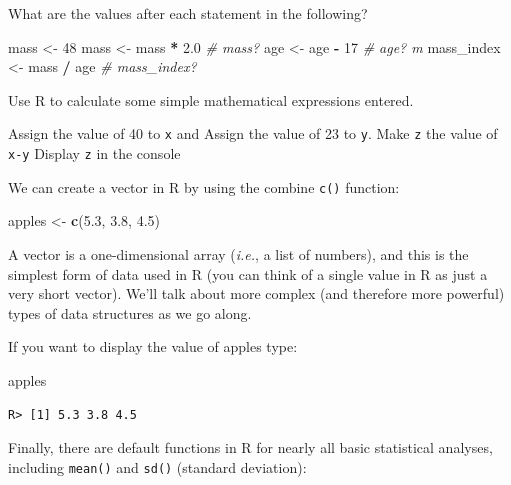 \documentclass[
]{book}
\newenvironment{Shaded}{\begin{snugshade}}{\end{snugshade}}
\newcommand{\CommentTok}[1]{\textcolor[rgb]{0.56,0.35,0.01}{\textit{#1}}}
\newcommand{\DecValTok}[1]{\textcolor[rgb]{0.00,0.00,0.81}{#1}}
\newcommand{\FloatTok}[1]{\textcolor[rgb]{0.00,0.00,0.81}{#1}}
\newcommand{\KeywordTok}[1]{\textcolor[rgb]{0.13,0.29,0.53}{\textbf{#1}}}
\newcommand{\NormalTok}[1]{#1}
\newcommand{\OperatorTok}[1]{\textcolor[rgb]{0.81,0.36,0.00}{\textbf{#1}}}
\newcommand{\StringTok}[1]{\textcolor[rgb]{0.31,0.60,0.02}{#1}}
\begin{document}
What are the values after each statement in the following?

\begin{Shaded}
\begin{Highlighting}[]
\NormalTok{mass <{-}}\StringTok{ }\DecValTok{48} 
\NormalTok{mass <{-}}\StringTok{ }\NormalTok{mass }\OperatorTok{*}\StringTok{ }\FloatTok{2.0} \CommentTok{\# mass? }
\NormalTok{age <{-}}\StringTok{ }\NormalTok{age }\OperatorTok{{-}}\StringTok{ }\DecValTok{17} \CommentTok{\# age? m}
\NormalTok{mass\_index <{-}}\StringTok{ }\NormalTok{mass }\OperatorTok{/}\StringTok{ }\NormalTok{age }\CommentTok{\# mass\_index?}
\end{Highlighting}
\end{Shaded}

Use R to calculate some simple mathematical expressions entered.

Assign the value of 40 to \texttt{x} and Assign the value of 23 to \texttt{y}. Make \texttt{z} the value of \texttt{x-y} Display \texttt{z} in the console

We can create a vector in R by using the combine \texttt{c()} function:

\begin{Shaded}
\begin{Highlighting}[]
\NormalTok{apples <{-}}\StringTok{ }\KeywordTok{c}\NormalTok{(}\FloatTok{5.3}\NormalTok{, }\FloatTok{3.8}\NormalTok{, }\FloatTok{4.5}\NormalTok{)}
\end{Highlighting}
\end{Shaded}

A vector is a one-dimensional array (\emph{i.e.}, a list of numbers), and this is the simplest form of data used in R (you can think of a single value in R as just a very short vector). We'll talk about more complex (and therefore more powerful) types of data structures as we go along.

If you want to display the value of apples type:

\begin{Shaded}
\begin{Highlighting}[]
\NormalTok{apples}
\end{Highlighting}
\end{Shaded}

\begin{verbatim}
R> [1] 5.3 3.8 4.5
\end{verbatim}

Finally, there are default functions in R for nearly all basic statistical analyses, including \texttt{mean()} and \texttt{sd()} (standard deviation):
\end{document}

